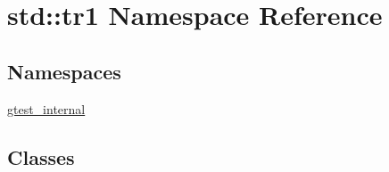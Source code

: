\hypertarget{namespacestd_1_1tr1}{\section{std\-:\-:tr1 Namespace Reference}
\label{namespacestd_1_1tr1}
}
\subsection*{Namespaces}
\begin{DoxyCompactItemize}
\item 
\hyperlink{namespacestd_1_1tr1_1_1gtest__internal}{gtest\-\_\-internal}
\end{DoxyCompactItemize}
\subsection*{Classes}
